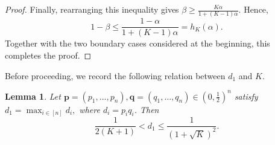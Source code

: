 \documentclass[11pt]{article}
\numberwithin{equation}{section}
\newtheorem{lemma}[theorem]{Lemma}
\theoremstyle{definition}
\theoremstyle{remark}
\begin{document}
\begin{proof}
Finally, rearranging this inequality gives
$
 \beta
 \geq
 \frac{K\alpha}{1+(K-1)\alpha}.
$
Hence,
\begin{equation*}
 1-\beta
 \leq
 \frac{1-\alpha}{1+(K-1)\alpha}
 =
 h_K(\alpha).
\end{equation*}
Together with the two boundary cases considered at the beginning, this
completes the proof.
\end{proof}

Before proceeding, we record the following relation between $d_1$ and $K$.

\begin{lemma}\label{lem:range}
Let $\mathbf p=(p_1,\ldots,p_n), \mathbf q=(q_1,\ldots,q_n)\in(0,\frac{1}{2})^n$ satisfy
$
 d_1=\max_{i\in[n]}d_i,
$
where $d_i=p_iq_i$.
Then
$$
 \frac{1}{2(K+1)}
 <
d_1
 \leq
 \frac{1}{(1+\sqrt K)^2}.
$$
\end{lemma}
\end{document}
